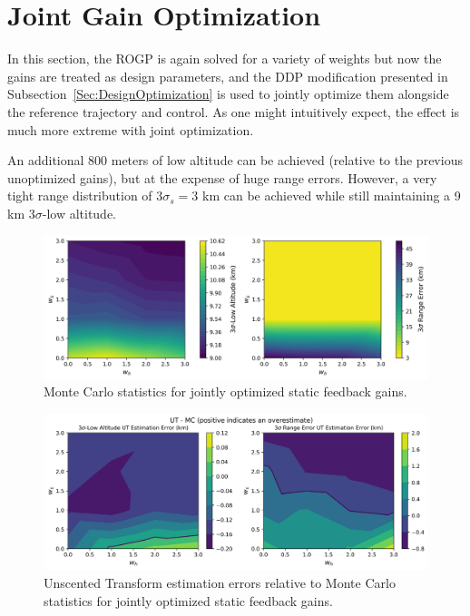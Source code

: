 \section{Joint Gain Optimization}

In this section, the ROGP is again solved for a variety of weights but now the gains are treated as design parameters, and the DDP modification presented in Subsection~\ref{Sec:DesignOptimization} is used to jointly optimize them alongside the reference trajectory and control. As one might intuitively expect, the effect is much more extreme with joint optimization. 

An additional 800 meters of low altitude can be achieved (relative to the previous unoptimized gains), but at the expense of huge range errors. However, a very tight range distribution of $3\sigma_s = 3$ km can be achieved while still maintaining a 9 km 3$\sigma$-low altitude.  
\begin{figure}[h!]
	\centering
	\includegraphics[width=1\textwidth]{Images/Reoptimized_WeightSweepMCResults}
	\caption{Monte Carlo statistics for jointly optimized static feedback gains.}
	\label{Fig:MCResultsOptGain}
\end{figure}
\begin{figure}[h!]
	\centering
	\includegraphics[width=1\textwidth]{Images/Reoptimized_WeightSweepError}
	\caption{Unscented Transform estimation errors relative to Monte Carlo statistics for jointly optimized static feedback gains.}
	\label{Fig:MCErrorsOptGain}
\end{figure}

